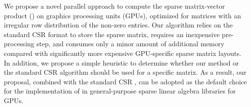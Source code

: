 We propose a novel parallel approach to compute the sparse matrix-vector
product (\spmv) on graphics processing units (GPUs), optimized for matrices 
with an irregular row distribution of the non-zero entries. Our algorithm
relies on the standard CSR format to store the sparse matrix, requires an inexpensive
pre-processing step,
and consumes only a minor amount of additional memory
compared with significantly more expensive GPU-specific sparse matrix layouts.
In addition,
we propose a simple heuristic to determine whether our method
or the standard CSR \spmv algorithm should be used for a specific matrix.
As a result, our proposal, combined with the standard CSR \spmv,
can be adopted as the default choice for the implementation
of \spmv in general-purpose sparse linear algebra libraries for GPUs.

